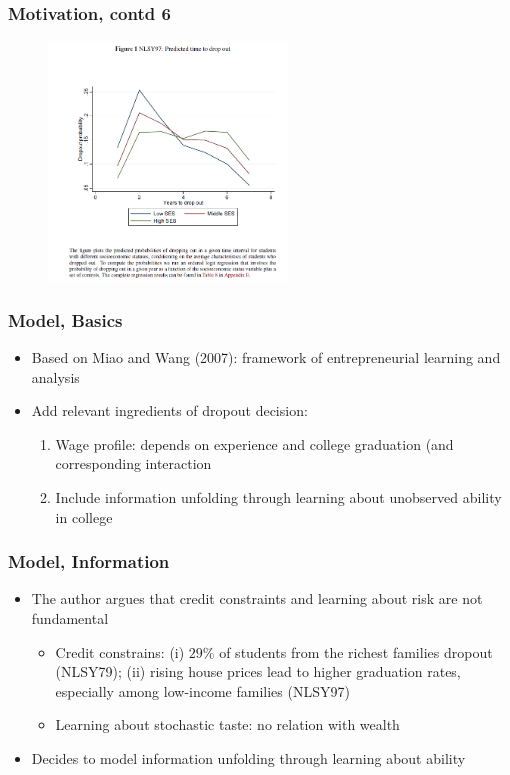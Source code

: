 \begin{frame}
	\frametitle{Motivation, contd 6}
		\begin{figure}[H] 
		\caption*{}
		\centering
		\includegraphics[width=2.5in, height=2.5in]{Figures/OT/figure1.png}
		\end{figure}
\end{frame}

\begin{frame}
	\frametitle{Model, Basics}
	\begin{itemize}
		\item Based on Miao and Wang (2007): framework of entrepreneurial learning and analysis
		\item Add relevant ingredients of dropout decision:
			\begin{enumerate}
				\item Wage profile: depends on experience and college graduation (and corresponding interaction
				\item Include information unfolding through learning about unobserved ability in college
			\end{enumerate}
	\end{itemize}
\end{frame}

\begin{frame}
	\frametitle{Model, Information}
		\begin{itemize}
			\item The author argues that credit constraints and learning about risk are not fundamental
				\begin{itemize}
					\item Credit constrains: (i) $29\%$ of students from the richest families dropout (NLSY79); (ii) rising house prices lead to higher graduation rates, especially among low-income families (NLSY97)
					\item Learning about stochastic taste: no relation with wealth
				\end{itemize}
		\item Decides to model information unfolding through learning about ability
		\end{itemize}
\end{frame}

